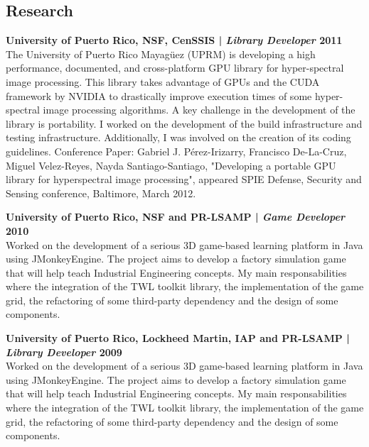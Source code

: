 \documentclass[margin,line]{res}
\begin{document}
\begin{resume}
\section{\sc Research}

{\bf University of Puerto Rico, NSF, CenSSIS  | {\em Library Developer} \hfill {\bf 2011 \\} }
\vspace{-.01cm}
The University of Puerto Rico Mayagüez (UPRM) is developing a high performance, documented, and cross-platform GPU library for hyper-spectral image processing. This library takes advantage of GPUs and the CUDA framework by NVIDIA to drastically improve execution times of some hyper-spectral image processing algorithms. A key challenge in the development of the library is portability. I worked on the development of the build infrastructure and testing infrastructure. Additionally, I was involved on the creation of its coding guidelines. Conference Paper: Gabriel J. Pérez-Irizarry, Francisco De-La-Cruz, Miguel Velez-Reyes, Nayda Santiago-Santiago, "Developing a portable GPU library for hyperspectral image processing", appeared SPIE Defense, Security and Sensing conference, Baltimore, March 2012.

\clearpage

{\bf University of Puerto Rico, NSF and PR-LSAMP | {\em Game Developer} \hfill {\bf 2010 \\} }
\vspace{-.01cm}
Worked on the development of a serious 3D game-based learning platform in Java using JMonkeyEngine. The project aims to develop a factory simulation game that will help teach Industrial Engineering concepts. My main responsabilities where the integration of the TWL toolkit library, the implementation of the game grid, the refactoring of some third-party dependency and the design of some components.



{\bf University of Puerto Rico, Lockheed Martin, IAP and PR-LSAMP | {\em Library Developer} \hfill {\bf 2009 \\} }
\vspace{-.01cm}
Worked on the development of a serious 3D game-based learning platform in Java using JMonkeyEngine. The project aims to develop a factory simulation game that will help teach Industrial Engineering concepts. My main responsabilities where the integration of the TWL toolkit library, the implementation of the game grid, the refactoring of some third-party dependency and the design of some components.


\end{resume}
\end{document}
